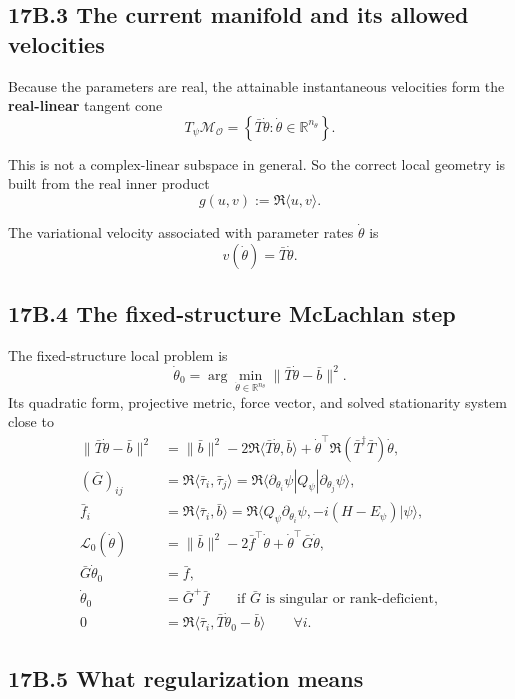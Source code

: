 \documentclass[11pt]{article}
\begin{document}
\subsection*{17B.3 The current manifold and its allowed velocities}


Because the parameters are real, the attainable instantaneous velocities form the \textbf{real-linear} tangent cone
\[
T_\psi\mathcal M_{\mathcal O}
=
\left\{
\bar T\dot\theta:\dot\theta\in\mathbb R^{n_\theta}
\right\}.
\]

This is not a complex-linear subspace in general. So the correct local geometry is built from the real inner product
\[
g(u,v):=\Re\langle u,v\rangle.
\]

The variational velocity associated with parameter rates $\dot\theta$ is
\[
v(\dot\theta)=\bar T\dot\theta.
\]

\subsection*{17B.4 The fixed-structure McLachlan step}


The fixed-structure local problem is
\[
\dot\theta_0=\arg\min_{\dot\theta\in\mathbb R^{n_\theta}}\|\bar T\dot\theta-\bar b\|^2.
\]
Its quadratic form, projective metric, force vector, and solved stationarity system close to
\[
\begin{aligned}
\|\bar T\dot\theta-\bar b\|^2
&=\|\bar b\|^2-2\Re\langle \bar T\dot\theta,\bar b\rangle+\dot\theta^\top\Re(\bar T^\dagger\bar T)\dot\theta,\\
(\bar G)_{ij}&=\Re\langle \bar\tau_i,\bar\tau_j\rangle=\Re\langle \partial_{\theta_i}\psi|Q_\psi|\partial_{\theta_j}\psi\rangle,\\
\bar f_i&=\Re\langle \bar\tau_i,\bar b\rangle=\Re\langle Q_\psi\partial_{\theta_i}\psi,-i(H-E_\psi)|\psi\rangle,\\
\mathcal L_0(\dot\theta)&=\|\bar b\|^2-2\bar f^\top\dot\theta+\dot\theta^\top\bar G\dot\theta,\\
\bar G\dot\theta_0&=\bar f,\\
\dot\theta_0&=\bar G^+\bar f\qquad\text{if }\bar G\text{ is singular or rank-deficient},\\
0&=\Re\langle \bar\tau_i,\bar T\dot\theta_0-\bar b\rangle\qquad \forall i.
\end{aligned}
\]

\subsection*{17B.5 What regularization means}
\end{document}
